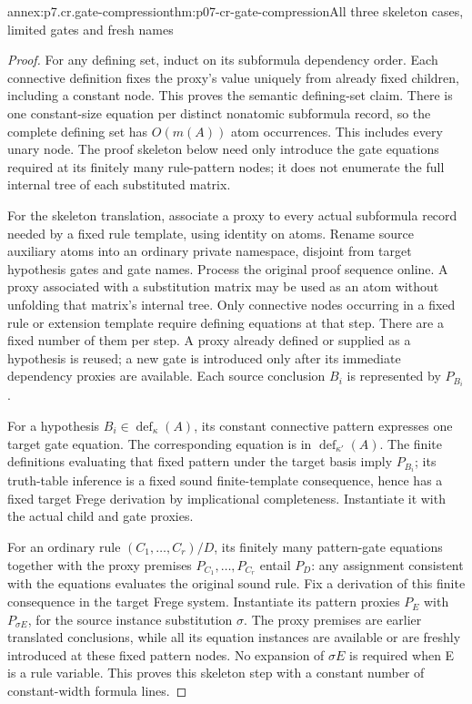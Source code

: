 \begin{annexitem}{annex:p7.cr.gate-compression}{thm:p07-cr-gate-compression}{All three skeleton cases, limited gates and fresh names}
\begin{proof}
For any defining set, induct on its subformula dependency order.
Each connective definition fixes the proxy's value uniquely from
already fixed children, including a constant node. This proves
the semantic defining-set claim. There is one constant-size equation
per distinct nonatomic subformula record, so the complete defining
set has \(O(m(A))\) atom occurrences. This includes every unary
node. The proof skeleton below need only introduce the gate equations
required at its finitely many rule-pattern nodes; it does not
enumerate the full internal tree of each substituted matrix.

For the skeleton translation, associate a proxy to every actual
subformula record needed by a fixed rule template, using identity
on atoms. Rename source auxiliary atoms into an ordinary private
namespace, disjoint from target hypothesis gates and gate names.
Process the original proof sequence online. A proxy associated
with a substitution matrix may be used as an atom without unfolding
that matrix's internal tree. Only connective nodes occurring in a
fixed rule or extension template require defining equations at that
step. There are a fixed number of them per step. A proxy already
defined or supplied as a hypothesis is reused; a new gate is
introduced only after its immediate dependency proxies are available.
Each source conclusion \(B_i\) is represented by \(P_{B_i}\).

For a hypothesis \(B_i\in\operatorname{def}_\kappa(A)\),
its constant connective pattern expresses one target gate equation.
The corresponding equation is in \(\operatorname{def}_{\kappa'}(A)\).
The finite definitions evaluating that fixed pattern under the
target basis imply \(P_{B_i}\); its truth-table inference is
a fixed sound finite-template consequence, hence has a fixed
target Frege derivation by implicational completeness. Instantiate
it with the actual child and gate proxies.

For an ordinary rule \((C_1,\ldots,C_r)/D\), its finitely many
pattern-gate equations together with the proxy premises
\(P_{C_1},\ldots,P_{C_r}\) entail \(P_D\): any assignment
consistent with the equations evaluates the original sound rule.
Fix a derivation of this finite consequence in the target Frege
system. Instantiate its pattern proxies \(P_E\) with
\(P_{\sigma E}\), for the source instance substitution \(\sigma\).
The proxy premises are earlier translated conclusions, while all
its equation instances are available or are freshly introduced
at these fixed pattern nodes. No expansion of \(\sigma E\)
is required when E is a rule variable. This proves this skeleton
step with a constant number of constant-width formula lines.


\end{proof}
\end{annexitem}
